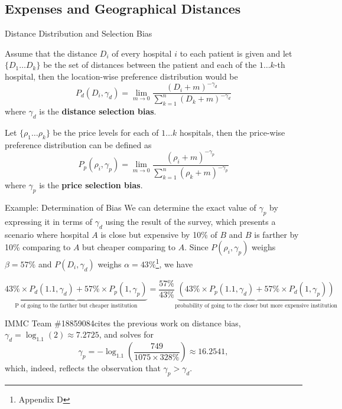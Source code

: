 \documentclass[8pt, hyperref={colorlinks=true}]{beamer}
\newcommand{\team}{IMMC Team \#18859084\hphantom{a}}
\begin{document}
\subsection{Expenses and Geographical Distances}

\begin{frame}{Distance Distribution and Selection Bias}


\begin{definition}
Assume that the distance $D_i$ of every hospital $i$ to each patient is given and let $\{D_1\dots D_k\}$ be the set of distances between the patient and each of the $1\dots k$-th hospital, then the location-wise preference distribution would be
\[
P_d\left(D_i, \gamma_d\right) = \lim_{m \to 0} \frac{(D_i + m)^{-\gamma_d}}{\displaystyle\sum_{k=1}^n (D_k + m)^{-\gamma_d}}
\]
where $\gamma_d$ is the \textbf{distance selection bias}.
\end{definition}


\begin{definition}
Let $\{\rho_1\dots\rho_k\}$ be the price levels for each of $1\dots k$ hospitals, then the price-wise preference distribution can be defined as
\[
P_p\left(\rho_i, \gamma_p\right) = \lim_{m \to 0} \frac{(\rho_i + m)^{-\gamma_p}}{\displaystyle\sum_{k=1}^n (\rho_k + m)^{-\gamma_p}}
\]
where $\gamma_p$ is the \textbf{price selection bias}. 
\end{definition}

\end{frame}

\begin{frame}{Example: Determination of Bias}
We can determine the exact value of $\gamma_p$ by expressing it in terms of $\gamma_d$ using the result of the survey, which presents a scenario where hospital $A$ is close but expensive by 10\% of $B$ and $B$ is farther by 10\% comparing to $A$ but cheaper comparing to $A$. Since $P \left(\rho_i, \gamma_p\right)$ weighs $\beta=57\%$ and $P \left(D_i,\gamma_d \right)$ weighs $\alpha=43\%$\footnote{Appendix D}, we have

\[
\underbrace{43\% \times P_d \left(1.1,\gamma_d \right) + 57\% \times P_p \left(1, \gamma_p\right)}_{\text{P of going to the farther but cheaper institution}} = \frac{57\%}{43\%} \underbrace{\left(43\% \times P_p \left(1.1,\gamma_d \right) + 57\% \times P_d \left(1, \gamma_p\right)\right)}_{\text{probability of going to the closer but more expensive institution}}
\]

\team cites the previous work on distance bias, $\gamma_d= \log_{1.1}(2) \approx 7.2725$, and solves for
\[
\gamma_p = -\log_{1.1}\left(\frac{749}{1075 \times 328\%}\right) \approx 16.2541,
\]
which, indeed, reflects the observation that $\gamma_p > \gamma_d$.
\end{frame}
\end{document}
